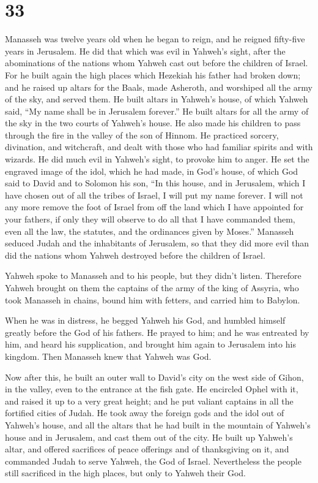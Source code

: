 \hypertarget{section-32}{%
\section{33}\label{section-32}}

 Manasseh was twelve years old when he began to reign, and
he reigned fifty-five years in Jerusalem.  He did that which
was evil in Yahweh's sight, after the abominations of the nations whom
Yahweh cast out before the children of Israel.  For he built
again the high places which Hezekiah his father had broken down; and he
raised up altars for the Baals, made Asheroth, and worshiped all the
army of the sky, and served them.  He built altars in
Yahweh's house, of which Yahweh said, ``My name shall be in Jerusalem
forever.''  He built altars for all the army of the sky in
the two courts of Yahweh's house.  He also made his children
to pass through the fire in the valley of the son of Hinnom. He
practiced sorcery, divination, and witchcraft, and dealt with those who
had familiar spirits and with wizards. He did much evil in Yahweh's
sight, to provoke him to anger.  He set the engraved image
of the idol, which he had made, in God's house, of which God said to
David and to Solomon his son, ``In this house, and in Jerusalem, which I
have chosen out of all the tribes of Israel, I will put my name forever.
 I will not any more remove the foot of Israel from off the
land which I have appointed for your fathers, if only they will observe
to do all that I have commanded them, even all the law, the statutes,
and the ordinances given by Moses.''  Manasseh seduced Judah
and the inhabitants of Jerusalem, so that they did more evil than did
the nations whom Yahweh destroyed before the children of Israel.

 Yahweh spoke to Manasseh and to his people, but they
didn't listen.  Therefore Yahweh brought on them the
captains of the army of the king of Assyria, who took Manasseh in
chains, bound him with fetters, and carried him to Babylon.

 When he was in distress, he begged Yahweh his God, and
humbled himself greatly before the God of his fathers.  He
prayed to him; and he was entreated by him, and heard his supplication,
and brought him again to Jerusalem into his kingdom. Then Manasseh knew
that Yahweh was God.

 Now after this, he built an outer wall to David's city on
the west side of Gihon, in the valley, even to the entrance at the fish
gate. He encircled Ophel with it, and raised it up to a very great
height; and he put valiant captains in all the fortified cities of
Judah.  He took away the foreign gods and the idol out of
Yahweh's house, and all the altars that he had built in the mountain of
Yahweh's house and in Jerusalem, and cast them out of the city.
 He built up Yahweh's altar, and offered sacrifices of
peace offerings and of thanksgiving on it, and commanded Judah to serve
Yahweh, the God of Israel.  Nevertheless the people still
sacrificed in the high places, but only to Yahweh their God.


